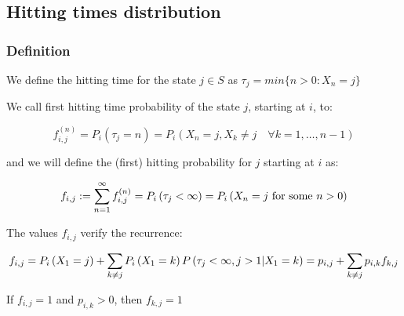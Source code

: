 \subsection{Hitting times distribution}
 \begin{frame}\frametitle{Definition}
    \vspace{2em}
    
    \begin{definition}
    We define the hitting time for the state \(j \in S\) as 
    $\tau_j = min \{n > 0 : X_n = j \}$
    \end{definition}
    
    \begin{definition}
    We call first hitting time probability of the state \(j\), starting at \(i\), to:

    \[
    f_{i,j}^{(n)} = P_i\left(\tau_j = n\right) = P_i\left(X_n = j, X_k \neq j \quad \forall k = 1, \ldots, n - 1 \right)
    \]

    and we will define the (first) hitting probability for \(j\) starting at \(i\) as:

    \[
    f_{i, j} := \sum_{n = 1}^{\infty} f_{i,j}^{(n)} = P_i\left(\tau_j < \infty\right) =
    P_i\left({X_n = j \textrm{ for some } n > 0}\right)
    \]
    \end{definition}
    
    The values $f_{i, j}$ verify the recurrence:

    \[
    f_{i,j} = P_i\left({X_1 = j}\right) + \sum_{k \neq j} P_i\left({X_1 = k}\right) P\left({\tau_j < \infty, j > 1 | X_1 = k }\right) = p_{i,j} + \sum_{k\neq j} p_{i,k} f_{k,j}
    \]

    \begin{lemma}
    If $f_{i,j} = 1$ and $p_{i,k} > 0$, then $f_{k,j} = 1$
    \end{lemma}
 \end{frame}
 
